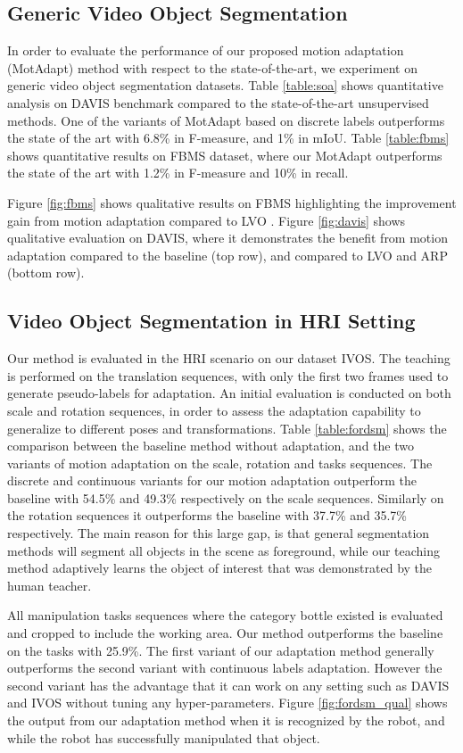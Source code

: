 \documentclass[letterpaper, 10 pt, conference]{ieeeconf}
\begin{document}
\subsection{Generic Video Object Segmentation}
In order to evaluate the performance of our proposed motion adaptation (MotAdapt) method with respect to the state-of-the-art, we experiment on generic video object segmentation datasets. Table \ref{table:soa} shows quantitative analysis on DAVIS benchmark compared to the state-of-the-art unsupervised methods. One of the variants of MotAdapt based on discrete labels outperforms the state of the art with 6.8\% in F-measure, and 1\% in mIoU. Table \ref{table:fbms} shows quantitative results on FBMS dataset, where our MotAdapt outperforms the state of the art with 1.2\% in F-measure and 10\% in recall. 

Figure \ref{fig:fbms} shows qualitative results on FBMS highlighting the improvement gain from motion adaptation compared to LVO \cite{tokmakov2017learning}. Figure \ref{fig:davis} shows qualitative evaluation on DAVIS, where it demonstrates the benefit from motion adaptation compared to the baseline (top row), and compared to LVO \cite{tokmakov2017learning} and ARP \cite{kohprimary} (bottom row).

\subsection{Video Object Segmentation in HRI Setting}
Our method is evaluated in the HRI scenario on our dataset IVOS. The teaching is performed on the translation sequences, with only the first two frames used to generate pseudo-labels for adaptation. An initial evaluation is conducted on both scale and rotation sequences, in order to assess the adaptation capability to generalize to different poses and transformations. Table \ref{table:fordsm} shows the comparison between the baseline method without adaptation, and the two variants of motion adaptation on the scale, rotation and tasks sequences. The discrete and continuous variants for our motion adaptation outperform the baseline with 54.5\% and 49.3\% respectively on the scale sequences. Similarly on the rotation sequences it outperforms the baseline with 37.7\% and 35.7\% respectively. The main reason for this large gap, is that general segmentation methods will segment all objects in the scene as foreground, while our teaching method adaptively learns the object of interest that was demonstrated by the human teacher. 

All manipulation tasks sequences where the category bottle existed is evaluated and cropped to include the working area. Our method outperforms the baseline on the tasks with 25.9\%. The first variant of our adaptation method generally outperforms the second variant with continuous labels adaptation. However the second variant has the advantage that it can work on any setting such as DAVIS and IVOS without tuning any hyper-parameters. Figure \ref{fig:fordsm_qual} shows the output from our adaptation method when it is recognized by the robot, and while the robot has successfully manipulated that object. 
\end{document}
